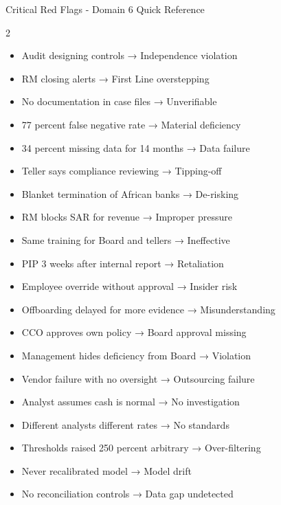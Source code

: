 \documentclass[11pt,a4paper]{beamer}
\begin{document}
\begin{frame}{Critical Red Flags - Domain 6 Quick Reference}
	\begin{multicols}{2}
		\begin{itemize}
			\item Audit designing controls → Independence violation
			\item RM closing alerts → First Line overstepping
			\item No documentation in case files → Unverifiable
			\item 77 percent false negative rate → Material deficiency
			\item 34 percent missing data for 14 months → Data failure
			\item Teller says compliance reviewing → Tipping-off
			\item Blanket termination of African banks → De-risking
			\item RM blocks SAR for revenue → Improper pressure
			\item Same training for Board and tellers → Ineffective
			\item PIP 3 weeks after internal report → Retaliation
			\item Employee override without approval → Insider risk
			\item Offboarding delayed for more evidence → Misunderstanding
			\item CCO approves own policy → Board approval missing
			\item Management hides deficiency from Board → Violation
			\item Vendor failure with no oversight → Outsourcing failure
			\item Analyst assumes cash is normal → No investigation
			\item Different analysts different rates → No standards
			\item Thresholds raised 250 percent arbitrary → Over-filtering
			\item Never recalibrated model → Model drift
			\item No reconciliation controls → Data gap undetected
		\end{itemize}
	\end{multicols}
\end{frame}
\end{document}
